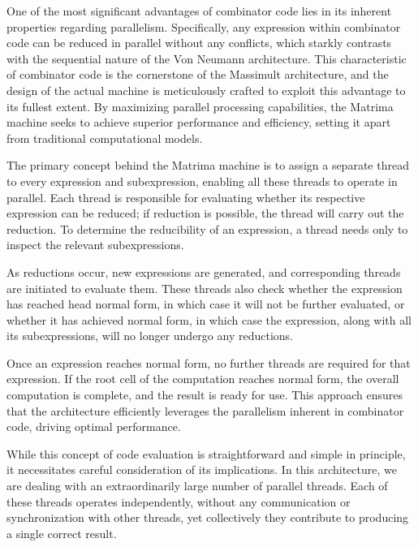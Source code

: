\documentclass{IEEEtran}
\begin{document}
\par One of the most significant advantages of combinator code lies in its inherent properties regarding parallelism. Specifically, any expression within combinator code can be reduced in parallel without any conflicts, which starkly contrasts with the sequential nature of the Von Neumann architecture. This characteristic of combinator code is the cornerstone of the Massimult architecture, and the design of the actual machine is meticulously crafted to exploit this advantage to its fullest extent. By maximizing parallel processing capabilities, the Matrima machine seeks to achieve superior performance and efficiency, setting it apart from traditional computational models.

\par The primary concept behind the Matrima machine is to assign a separate thread to every expression and subexpression, enabling all these threads to operate in parallel. Each thread is responsible for evaluating whether its respective expression can be reduced; if reduction is possible, the thread will carry out the reduction. To determine the reducibility of an expression, a thread needs only to inspect the relevant subexpressions.

\par As reductions occur, new expressions are generated, and corresponding threads are initiated to evaluate them. These threads also check whether the expression has reached head normal form, in which case it will not be further evaluated, or whether it has achieved normal form, in which case the expression, along with all its subexpressions, will no longer undergo any reductions.

\par Once an expression reaches normal form, no further threads are required for that expression. If the root cell of the computation reaches normal form, the overall computation is complete, and the result is ready for use. This approach ensures that the architecture efficiently leverages the parallelism inherent in combinator code, driving optimal performance.

\par While this concept of code evaluation is straightforward and simple in principle, it necessitates careful consideration of its implications. In this architecture, we are dealing with an extraordinarily large number of parallel threads. Each of these threads operates independently, without any communication or synchronization with other threads, yet collectively they contribute to producing a single correct result.
\end{document}
